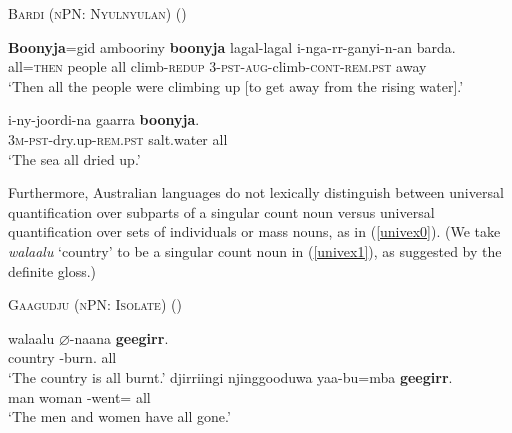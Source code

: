 \documentclass[12pt,egregdoesnotlikesansseriftitles]{scrartcl}
\begin{document}
\begin{exe}
\ex  \textsc{Bardi (nPN: Nyulnyulan)} \hfill(\citealt{bowern12}) \label{univmasscount1}
\begin{xlist}
\ex %
\gll \textbf{Boonyja}=gid ambooriny \textbf{boonyja} lagal-lagal   i-nga-rr-ganyi-n-an barda.\\
all=\textsc{then} people all climb-\textsc{redup}  3-\textsc{pst-aug}-climb-\textsc{cont-rem.pst} away\\
`Then all the people were climbing up [to get away from the rising water].'\label{univmasscount2}

\ex \gll i-ny-joordi-na gaarra \textbf{boonyja}.\\
3\textsc{m-pst}-dry.up-\textsc{rem.pst} salt.water all\\
`The sea all dried up.'\label{univmasscount3} %
\end{xlist}
\end{exe}


Furthermore,  Australian languages  do not lexically distinguish between universal quantification  over subparts of a singular count noun versus universal quantification over sets of individuals or mass nouns, as in (\ref{univex0}). (We take \textit{walaalu} `country' to be a singular count noun in (\ref{univex1}), as suggested by the definite gloss.)


\begin{exe}
 \ex \textsc{Gaagudju (nPN: Isolate)} \hfill (\citealt[307]{harvey92}) \label{univex0}
  \begin{xlist}
      \ex \gll walaalu $\varnothing$-naana \textbf{geegirr}.\\
    country \Cliv-burn.\Pp{} all\\
    \glt `The country is all burnt.' \label{univex1}
    \ex \gll djirriingi njinggooduwa yaa-bu=mba \textbf{geegirr}.\\
    man woman \Third\Cli-went=\Aug{} all\\
    \glt `The men and women have all gone.' \label{univex2}
  \end{xlist}
\end{exe}
\end{document}
